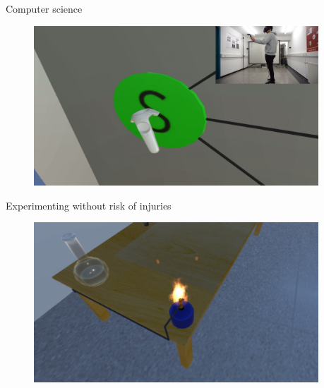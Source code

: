 \documentclass[final,hyperref={pdfpagelabels=false}]{beamer}
\begin{document}
\begin{frame}[t]
\begin{columns}[t]
\begin{column}{.465\textwidth}
\begin{block}{Computer science}
	\begin{figure}
		\centering
		\includegraphics[width=0.95\linewidth]{VSL_Screen_2}

	\end{figure}
\end{block}

\vspace{0.3cm}

\begin{block}{Experimenting without risk of injuries}
    \begin{figure}
    	\centering
    	\includegraphics[width=0.95\linewidth]{bunsenbrenner}
    \end{figure}
\end{block}

\end{column} %

\begin{column}{.03\textwidth}\end{column} %


\end{columns}
\end{frame}
\end{document}
